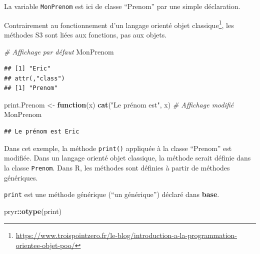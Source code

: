 \documentclass[
  12pt,
  french,
  a4paper,
  extrafontsizes,onecolumn,openright
  ]{memoir}
\newenvironment{Shaded}{\begin{snugshade}}{\end{snugshade}}
\newcommand{\CommentTok}[1]{\textcolor[rgb]{0.56,0.35,0.01}{\textit{#1}}}
\newcommand{\ControlFlowTok}[1]{\textcolor[rgb]{0.13,0.29,0.53}{\textbf{#1}}}
\newcommand{\FunctionTok}[1]{\textcolor[rgb]{0.13,0.29,0.53}{\textbf{#1}}}
\newcommand{\NormalTok}[1]{#1}
\newcommand{\OtherTok}[1]{\textcolor[rgb]{0.56,0.35,0.01}{#1}}
\newcommand{\SpecialCharTok}[1]{\textcolor[rgb]{0.81,0.36,0.00}{\textbf{#1}}}
\newcommand{\StringTok}[1]{\textcolor[rgb]{0.31,0.60,0.02}{#1}}
\begin{document}
\normalsize

La variable \texttt{MonPrenom} est ici de classe \enquote{Prenom} par une simple déclaration.

Contrairement au fonctionnement d'un langage orienté objet classique\footnote{\url{https://www.troispointzero.fr/le-blog/introduction-a-la-programmation-orientee-objet-poo/}}, les méthodes S3 sont liées aux fonctions, pas aux objets.

\scriptsize

\begin{Shaded}
\begin{Highlighting}[]
\CommentTok{\# Affichage par défaut}
\NormalTok{MonPrenom}
\end{Highlighting}
\end{Shaded}

\begin{verbatim}
## [1] "Eric"
## attr(,"class")
## [1] "Prenom"
\end{verbatim}

\begin{Shaded}
\begin{Highlighting}[]
\NormalTok{print.Prenom }\OtherTok{\textless{}{-}} \ControlFlowTok{function}\NormalTok{(x) }\FunctionTok{cat}\NormalTok{(}\StringTok{"Le prénom est"}\NormalTok{, x) }
\CommentTok{\# Affichage modifié}
\NormalTok{MonPrenom}
\end{Highlighting}
\end{Shaded}

\begin{verbatim}
## Le prénom est Eric
\end{verbatim}

\normalsize

Dans cet exemple, la méthode \texttt{print()} appliquée à la classe \enquote{Prenom} est modifiée.
Dans un langage orienté objet classique, la méthode serait définie dans la classe \texttt{Prenom}.
Dans R, les méthodes sont définies à partir de méthodes génériques.

\texttt{print} est une méthode générique (\enquote{un générique}) déclaré dans \textbf{base}.

\scriptsize

\begin{Shaded}
\begin{Highlighting}[]
\NormalTok{pryr}\SpecialCharTok{::}\FunctionTok{otype}\NormalTok{(print)}
\end{Highlighting}
\end{Shaded}
\end{document}
